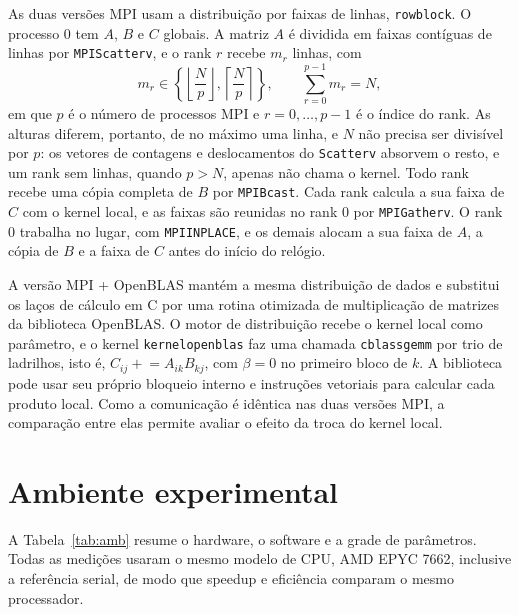 \documentclass[Portugues]{ic-tese-v3}
\DeclareRobustCommand{\_}{\textunderscore\allowbreak} %
\begin{document}
As duas versões MPI usam a distribuição por faixas de linhas, \texttt{row\_block}. O processo 0 tem $A$, $B$ e $C$ globais. A matriz $A$ é dividida em faixas contíguas de linhas por \texttt{MPI\_Scatterv}, e o rank $r$ recebe $m_r$ linhas, com
\begin{equation}\label{eq:linhas}
m_r \in \left\{ \left\lfloor \frac{N}{p} \right\rfloor, \left\lceil \frac{N}{p} \right\rceil \right\},
\qquad \sum_{r=0}^{p-1} m_r = N,
\end{equation}
em que $p$ é o número de processos MPI e $r = 0, \dots, p-1$ é o índice do rank. As alturas diferem, portanto, de no máximo uma linha, e $N$ não precisa ser divisível por $p$: os vetores de contagens e deslocamentos do \texttt{Scatterv} absorvem o resto, e um rank sem linhas, quando $p>N$, apenas não chama o kernel. Todo rank recebe uma cópia completa de $B$ por \texttt{MPI\_Bcast}. Cada rank calcula a sua faixa de $C$ com o kernel local, e as faixas são reunidas no rank 0 por \texttt{MPI\_Gatherv}. O rank 0 trabalha no lugar, com \texttt{MPI\_IN\_PLACE}, e os demais alocam a sua faixa de $A$, a cópia de $B$ e a faixa de $C$ antes do início do relógio.

A versão MPI + OpenBLAS mantém a mesma distribuição de dados e substitui os laços de cálculo em C por uma rotina otimizada de multiplicação de matrizes da biblioteca OpenBLAS. O motor de distribuição recebe o kernel local como parâmetro, e o kernel \texttt{kernel\_openblas} faz uma chamada \texttt{cblas\_sgemm} por trio de ladrilhos, isto é, $C_{ij} \mathrel{+}= A_{ik}B_{kj}$, com $\beta=0$ no primeiro bloco de $k$. A biblioteca pode usar seu próprio bloqueio interno e instruções vetoriais para calcular cada produto local. Como a comunicação é idêntica nas duas versões MPI, a comparação entre elas permite avaliar o efeito da troca do kernel local.

\section{Ambiente experimental}
A Tabela~\ref{tab:amb} resume o hardware, o software e a grade de parâmetros. Todas as medições usaram o mesmo modelo de CPU, AMD EPYC 7662, inclusive a referência serial, de modo que speedup e eficiência comparam o mesmo processador.
\end{document}
